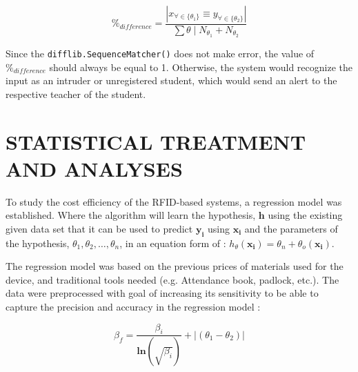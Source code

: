 \documentclass[12pt]{article}
\begin{document}
\begin{equation}
	\%_{difference} = \frac{|x_{\forall \in \{\theta_1\}} \equiv y_{\forall \in \{ \theta_2\}}|}{\sum \theta\;|\; N_{\theta_{1}} + N_{\theta_{2}}}
\end{equation}

Since the \texttt{difflib.SequenceMatcher()} does not make error, the value of $\%_{difference}$ should always be equal to 1. Otherwise, the system would recognize the input as an intruder or unregistered student, which would send an alert to the respective teacher of the student.

\newpage
\section*{STATISTICAL TREATMENT AND ANALYSES}

To study the cost efficiency of the RFID-based systems, a regression model was established. Where the algorithm will learn the hypothesis, $\mathbf{h}$ using the existing given data set that it can be used to predict $\mathbf{y_i}$ using $\mathbf{x_i}$ and the parameters of the hypothesis, $\theta_1, \theta_2, \dots, \theta_n$, in an equation form of : $h_\theta (\mathbf{x_i}) = \theta_n + \theta_o (\mathbf{x_i})$.

The regression model was based on the previous prices of materials used for the device, and traditional tools needed (e.g. Attendance book, padlock, etc.). The data were preprocessed with goal of increasing its sensitivity to be able to capture the precision and accuracy in the regression model :


\begin{equation}
	\beta_f = \frac{\beta_i}{\mathbf{ln}(\sqrt{\beta_i})} + |(\theta_1 - \theta_2)|
\end{equation}	
	
\end{document}
